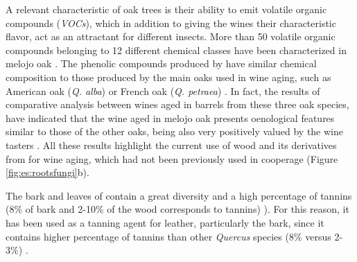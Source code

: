 A relevant characteristic of oak trees is their ability to emit volatile organic compounds (\emph{VOCs}), which in addition to giving the wines their characteristic flavor, act as an attractant for different insects. More than 50 volatile organic compounds belonging to 12 different chemical classes have been characterized in melojo oak \autocites{Ramiloetal2017VolatileOrganic}. The phenolic compounds produced by \Qp have similar chemical composition to those produced by the main oaks used in wine aging, such as American oak (\emph{Q. alba}) or French oak (\emph{Q. petraea}) \autocites{Gallegoetal2012PhenolicCompounds}. In fact, the results of comparative analysis between wines aged in barrels from these three oak species, have indicated that the wine aged in melojo oak presents oenological features similar to those of the other oaks, being also very positively valued by the wine tasters \autocites{CadahiaFernandezdeSimon2004UtilizacionRoble,FernandezdeSimonetal2008VolatileCompounds,FernandezdeSimonetal2009VolatileCompounds}. All these results highlight the current use of \Qp wood and its derivatives from for wine aging, which had not been previously used in cooperage \autocites{Gallego2013EstudioPotencial,MartinezGiletal2020EffectSize} (Figure \ref{fig:es:rootsfungi}b).

The bark and leaves of \Qp contain a great diversity and a high percentage of tannins (8\% of bark and 2-10\% of the wood corresponds to tannins) \autocites{FernandezdeSimonetal2006ChemicalCharacterization,Doceetal2007EffectImmature,TornerOchoa1952CurtientesVegetales}). For this reason, it has been used as a tanning agent for leather, particularly the bark, since it contains higher percentage of tannins than other \emph{Quercus} species (8\% versus 2-3\%) \autocites{TornerOchoa1952CurtientesVegetales}.

